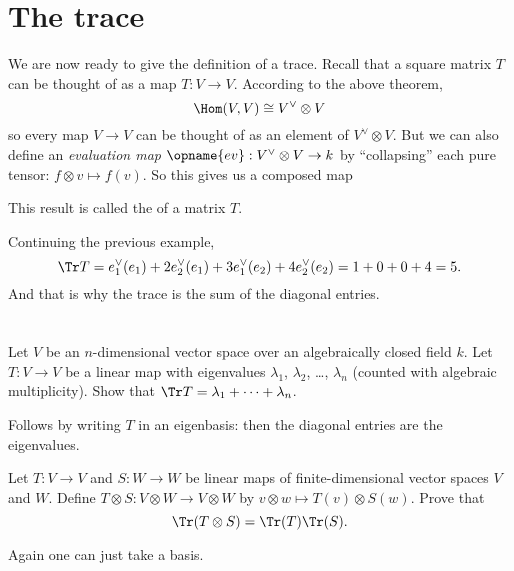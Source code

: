 \section{The trace}
We are now ready to give the definition of a trace.
Recall that a square matrix $T$ can be thought of as a map $T \colon V \to V$.
According to the above theorem,
\[ \Hom(V, V) \cong V^\vee \otimes V \]
so every map $V \to V$ can be thought of as an element of $V^\vee \otimes V$.
But we can also define an
\emph{evaluation map} $\opname{ev} : V^\vee \otimes V \to k$
by ``collapsing'' each pure tensor: $f \otimes v \mapsto f(v)$.
So this gives us a composed map
\begin{center}
\end{center}
This result is called the  of a matrix $T$.

\begin{example}
	Continuing the previous example,
	\[ \Tr T = e_1^\vee(e_1) + 2e_2^\vee(e_1)
		+ 3e_1^\vee(e_2) + 4e_2^\vee(e_2)
		= 1 + 0 + 0 + 4 = 5. \]
	And that is why the trace is the sum of the diagonal entries.
\end{example}

\section{\problemhead}

\begin{problem}
	Let $V$ be an $n$-dimensional vector space
	over an algebraically closed field $k$.
	Let $T \colon V \to V$ be a linear map with
	eigenvalues $\lambda_1$, $\lambda_2$, \dots, $\lambda_n$
	(counted with algebraic multiplicity).
	Show that $\Tr T = \lambda_1 + \dots + \lambda_n$.
	\begin{hint}
		Follows by writing $T$ in an eigenbasis:
		then the diagonal entries are the eigenvalues.
	\end{hint}
\end{problem}

\begin{dproblem}
	Let $T \colon V \to V$ and $S \colon W \to W$ be linear maps
	of finite-dimensional vector spaces $V$ and $W$.
	Define $T \otimes S \colon V \otimes W \to V \otimes W$
	by $v \otimes w \mapsto T(v) \otimes S(w)$.
	Prove that \[ \Tr(T \otimes S) = \Tr(T) \Tr(S). \]
	\begin{hint}
		Again one can just take a basis.
	\end{hint}
\end{dproblem}

